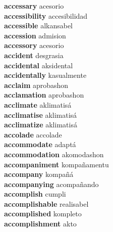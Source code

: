 \textbf{accessary } acesorio \\
\textbf{accessibility } accesibilidad \\
\textbf{accessible } alkansabel \\
\textbf{accession } admision \\
\textbf{accessory } acesorio \\
\textbf{accident } desgrasia \\
\textbf{accidental } aksidental \\
\textbf{accidentally } kasualmente \\
\textbf{acclaim } aprobashon \\
\textbf{acclamation } aprobashon \\
\textbf{acclimate } aklimatisá \\
\textbf{acclimatise } aklimatisá \\
\textbf{acclimatize } aklimatisá \\
\textbf{accolade } accolade \\
\textbf{accommodate } adaptá \\
\textbf{accommodation } akomodashon \\
\textbf{accompaniment } kompañamentu \\
\textbf{accompany } kompañá \\
\textbf{accompanying } acompañando \\
\textbf{accomplish } cumpli \\
\textbf{accomplishable } realisabel \\
\textbf{accomplished } kompleto \\
\textbf{accomplishment } akto \\
